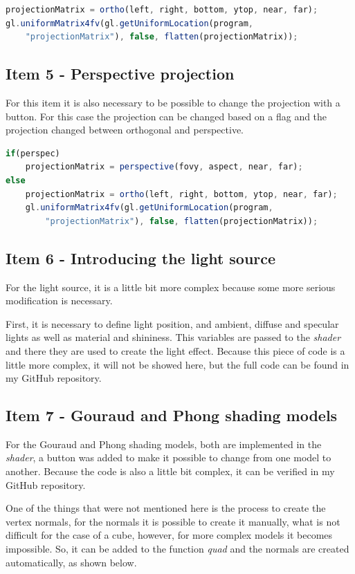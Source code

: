 \documentclass{article}
\begin{document}
\begin{lstlisting}[language=JavaScript]
projectionMatrix = ortho(left, right, bottom, ytop, near, far); 
gl.uniformMatrix4fv(gl.getUniformLocation(program,
    "projectionMatrix"), false, flatten(projectionMatrix));
\end{lstlisting}

\subsection {Item 5 - Perspective projection}
For this item it is also necessary to be possible to change the projection with a button. For this case the projection can be changed based on a flag and the projection changed between orthogonal and perspective.

\begin{lstlisting}[language=JavaScript]
if(perspec)
    projectionMatrix = perspective(fovy, aspect, near, far);
else
    projectionMatrix = ortho(left, right, bottom, ytop, near, far);
    gl.uniformMatrix4fv(gl.getUniformLocation(program,
        "projectionMatrix"), false, flatten(projectionMatrix));
\end{lstlisting}

\subsection {Item 6 - Introducing the light source}
For the light source, it is a little bit more complex because some more serious modification is necessary.

First, it is necessary to define light position, and ambient, diffuse and specular lights as well as material and shininess. This variables are passed to the \textit{shader} and there they are used to create the light effect. Because this piece of code is a little more complex, it will not be showed here, but the full code can be found in my GitHub repository.

\subsection {Item 7 - Gouraud and Phong shading models}
For the Gouraud and Phong shading models, both are implemented in the \textit{shader}, a button was added to make it possible to change from one model to another. Because the code is also a little bit complex, it can be verified in my GitHub repository.

One of the things that were not mentioned here is the process to create the vertex normals, for the normals it is possible to create it manually, what is not difficult for the case of a cube, however, for more complex models it becomes impossible. So, it can be added to the function \textit{quad} and the normals are created automatically, as shown below.
\end{document}
